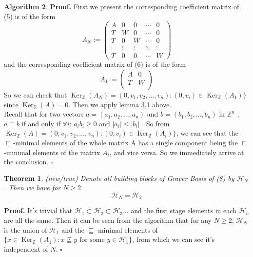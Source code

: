\documentclass{article}
\theoremstyle{plain}
\newtheorem{theorem}{Theorem}[section]
\theoremstyle{definition}
\newtheorem{algorithm}[theorem]{Algorithm}
\begin{document}
\begin{algorithm}
\noindent\textbf{Proof.}  First we present the corresponding coefficient matrix of (5) is of the form
$$
A_N:=\left(\begin{array}{ccccc}
A & 0 & 0 & \cdots & 0 \\
T & W & 0 & \cdots & 0 \\
T & 0 & W & \cdots & 0 \\
\vdots & \vdots & \vdots & \ddots & \vdots \\
T & 0 & 0 & \cdots & W
\end{array}\right)
$$
and  the corresponding coefficient matrix of (6) is of the form 
$$
A_{1}:=\left(\begin{array}{cc}
A & 0  \\
T & W  \\
\end{array}\right)
$$
So we can check that $\operatorname{Ker}_{\mathbb{Z}}(A_N)=(0,v_1,v_2,...,v_n):(0,v_i)\in \operatorname{Ker}_{\mathbb{Z}}(A_1) \}$ since $\operatorname{Ker}_{\mathbb{R}}(A)=0$. Then we apply lemma 3.1 above.\\

Recall that for two vectors $a=(a_1,a_2,...,a_n)$ and $b=(b_1,b_2,...,b_n)$ in $\mathbb{Z}^{n}$ , $a \sqsubseteq b$ if and only if  $\forall i$:  $a_{i} b_{i} \geq 0 $ and $\left|a_{i}\right| \leq\left|b_{i}\right|$ . So from $\operatorname{Ker}_{\mathbb{Z}}(A)=(0,v_1,v_2,...,v_n):(0,v_i)\in \operatorname{Ker}_{\mathbb{Z}}(A_i) \}$, we can see that the  $\sqsubseteq$-minimal elements of the whole matrix A has a single component being the  $\sqsubseteq$-minimal elements of the  matrix $A_i$, and vice versa. So we immediately arrive at the conclusion. \hfill $\square$\\

\begin{theorem}  (new/true) Denote all building blocks of Graver Basis of  (8) by $\mathcal{H}_{N}$. Then we have for $N\geq 2$ $$\mathcal{H}_N=\mathcal{H}_2$$\end{theorem}

\noindent\textbf{Proof.} It's trivial that $\mathcal{H}_1\subset\mathcal{H}_2\subset \mathcal{H}_3...$ and the first stage elements in each  $\mathcal{H}_n$ are all the same. Then it can be seen from the algorithm that for any $N\geq 2$, $\mathcal{H}_N$ is the union of $\mathcal{H}_1$ and the $\sqsubseteq$-minimal elements of $\{x\in\operatorname{Ker}_{\mathbb{Z}}(A_1):x\not\sqsubseteq y \text{ for some }y\in \mathcal{H}_1 \}$, from which we can see it's independent of $N$. \hfill $\square$


\end{algorithm}
\end{document}
